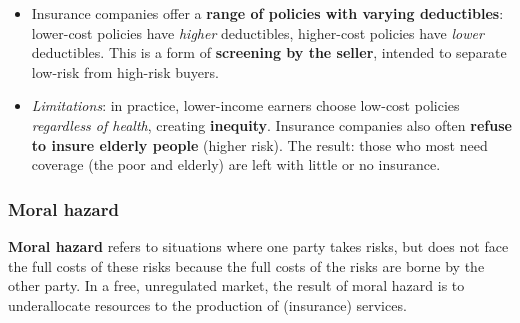 \documentclass[a4paper,12pt]{article}
\newcommand{\needbold}[1]{\textcolor{red!70!black}{\textbf{#1}}}
\begin{document}
\begin{itemize}
\begin{itemize}
\begin{itemize}
      \item Insurance companies offer a \textbf{range of policies with varying deductibles}: lower-cost policies have \textit{higher} deductibles, higher-cost policies have \textit{lower} deductibles. This is a form of \textbf{screening by the seller}, intended to separate low-risk from high-risk buyers.
      \item \textit{Limitations}: in practice, lower-income earners choose low-cost policies \textit{regardless of health}, creating \textbf{inequity}. Insurance companies also often \textbf{refuse to insure elderly people} (higher risk). The result: those who most need coverage (the poor and elderly) are left with little or no insurance.
    \end{itemize}
  \end{itemize}
\end{itemize}
\subsubsection*{Moral hazard}
\needbold{Moral hazard} refers to situations where one party takes risks, but does not face the full costs of these risks because the full costs of the risks are borne by the other party. In a free, unregulated market, the result of moral hazard is to underallocate resources to the production of (insurance) services.
\end{document}
